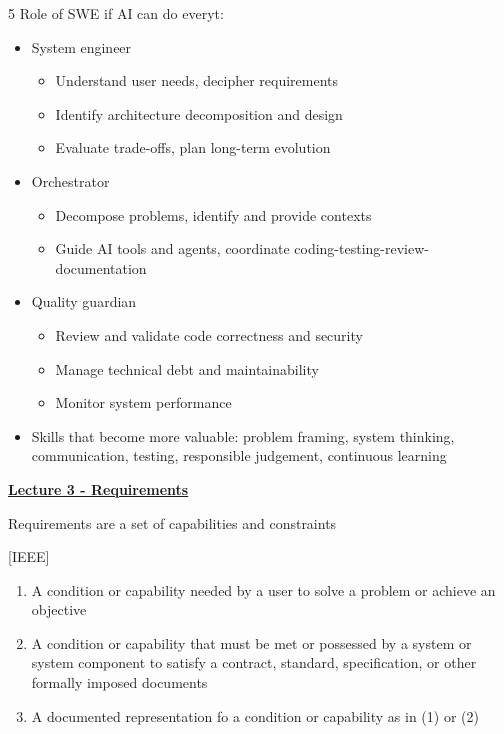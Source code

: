 \documentclass[landscape,a4paper]{extarticle}
\begin{document}
\begin{multicols*}{5}
    Role of SWE if AI can do everyt:
    \begin{itemize}
        \item System engineer
        \begin{itemize}
            \item Understand user needs, decipher requirements
            \item Identify architecture decomposition and design
            \item Evaluate trade-offs, plan long-term evolution
        \end{itemize}
        \item Orchestrator
        \begin{itemize}
            \item Decompose problems, identify and provide contexts
            \item Guide AI tools and agents, coordinate coding-testing-review-documentation
        \end{itemize}
        \item Quality guardian
        \begin{itemize}
            \item Review and validate code correctness and security
            \item Manage technical debt and maintainability
            \item Monitor system performance
        \end{itemize}
        \item Skills that become more valuable: problem framing, system thinking, communication,
        testing, responsible judgement, continuous learning
    \end{itemize}


    \uline{\textbf{Lecture 3 - Requirements}}

    Requirements are a set of capabilities and constraints

    [IEEE]
    \begin{enumerate}
        \item A condition or capability needed by a user to solve a problem or achieve an objective
        \item A condition or capability that must be met or possessed by a system or system component
        to satisfy a contract, standard, specification, or other formally imposed documents
        \item A documented representation fo a condition or capability as in (1) or (2)
    \end{enumerate}


\end{multicols*}
\end{document}
